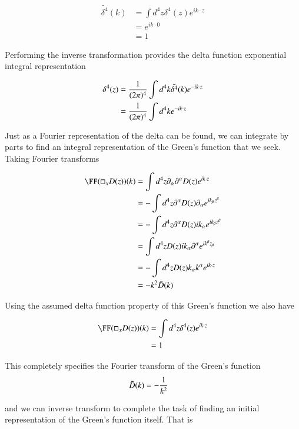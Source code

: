 \begin{align*}
\tilde{\delta^4}(k) 
&= \int d^4 z \delta^4(z) e^{i k \cdot z} \\
&= e^{i k \cdot 0} \\
&= 1
\end{align*}

Performing the inverse transformation provides the delta function exponential integral representation 

\begin{align*}
\delta^4(z) 
&= \frac{1}{(2\pi)^4} \int d^4 k \tilde{\delta^4}(k) e^{-i k \cdot z} \\
&= \frac{1}{(2\pi)^4} \int d^4 k e^{-i k \cdot z} \\
\end{align*}

Just as a Fourier representation of the delta can be found, we can integrate by parts to find an integral representation of the Green's function that we seek.  Taking Fourier transforms

\begin{align*}
\FF(\square_x D(z))(k) 
&= \int d^4 z \partial_\alpha \partial^\alpha D(z) e^{i k \cdot z} \\
&= -\int d^4 z \partial^\alpha D(z) \partial_\alpha e^{i k_\beta z^\beta} \\
&= -\int d^4 z \partial^\alpha D(z) i k_\alpha e^{i k_\beta z^\beta} \\
&= \int d^4 z D(z) i k_\alpha \partial^\alpha e^{i k^\beta z_\beta} \\
&= -\int d^4 z D(z) k_\alpha k^\alpha e^{i k \cdot z } \\
&= - k^2 \tilde{D}(k)
\end{align*}

Using the assumed delta function property of this Green's function we also have

\begin{align*}
\FF(\square_x D(z))(k) 
&= \int d^4 z \delta^4(z) e^{i k \cdot z} \\
&= 1
\end{align*}

This completely specifies the Fourier transform of the Green's function
\begin{align}\label{eqn:jacksonRet:boo7}
\tilde{D}(k) &= - \frac{1}{k^2}
\end{align}

and we can inverse transform to complete the task of finding an initial representation of the Green's function itself.  That is

